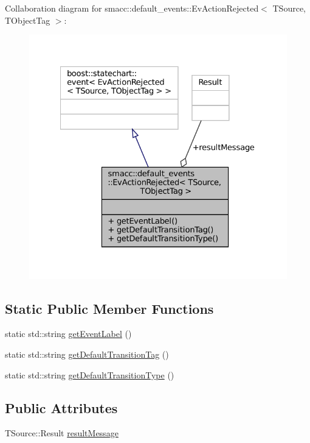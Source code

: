 Collaboration diagram for smacc\+:\+:default\+\_\+events\+:\+:Ev\+Action\+Rejected$<$ T\+Source, T\+Object\+Tag $>$\+:
\nopagebreak
\begin{figure}[H]
\begin{center}
\leavevmode
\includegraphics[width=327pt]{structsmacc_1_1default__events_1_1EvActionRejected__coll__graph}
\end{center}
\end{figure}
\subsection*{Static Public Member Functions}
\begin{DoxyCompactItemize}
\item 
static std\+::string \hyperlink{structsmacc_1_1default__events_1_1EvActionRejected_ad86fe8ccabe089f94cfaffdde3dadd0b}{get\+Event\+Label} ()
\item 
static std\+::string \hyperlink{structsmacc_1_1default__events_1_1EvActionRejected_af826dc01da958697898f0f70801f87d6}{get\+Default\+Transition\+Tag} ()
\item 
static std\+::string \hyperlink{structsmacc_1_1default__events_1_1EvActionRejected_a2ab427b06156f1c1776cb93d0277c025}{get\+Default\+Transition\+Type} ()
\end{DoxyCompactItemize}
\subsection*{Public Attributes}
\begin{DoxyCompactItemize}
\item 
T\+Source\+::\+Result \hyperlink{structsmacc_1_1default__events_1_1EvActionRejected_a40b6bcf337a76104499c82d0c4d5a49f}{result\+Message}
\end{DoxyCompactItemize}


